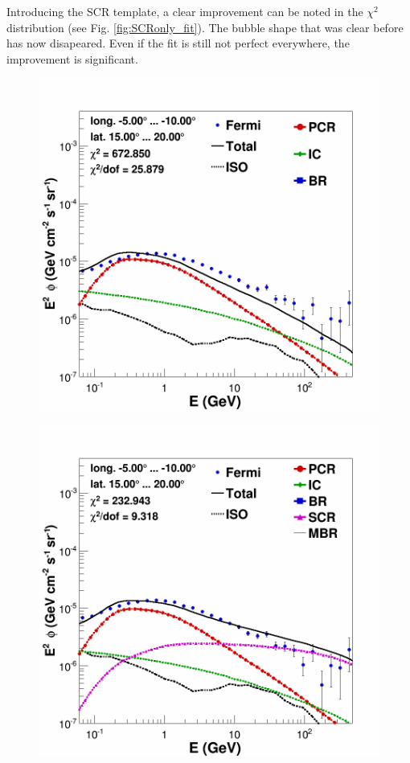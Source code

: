 Introducing the SCR template, a clear improvement can be noted in the $\chi^2$ distribution (see Fig. \ref{fig:SCRonly_fit}). The bubble shape that was clear before has now disapeared. Even if the fit is still not perfect everywhere, the improvement is significant.

\begin{figure}[h]
  \centering
  \begin{minipage}[h]{0.45\textwidth}
  	\centering
	\includegraphics[width=1.\linewidth]{pic/results/bkgdonly_spectra_bubble_example.png}
  	\label{fig:SCRonly_bubble_spec}
  \end{minipage}
  \hfill
  \begin{minipage}[h]{0.45\textwidth}
	  \centering
	  \includegraphics[width=1.\linewidth]{pic/results/SCRonly_spectra_bubble_example.png}

\end{minipage}
\end{figure}
